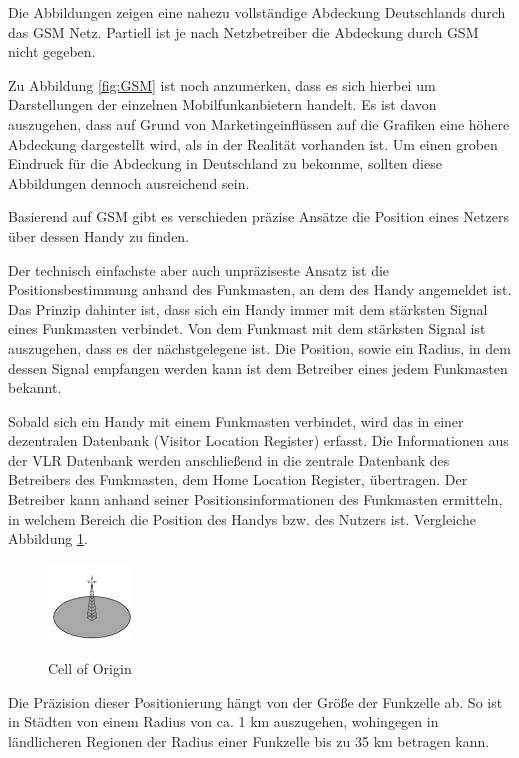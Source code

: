 Die Abbildungen zeigen eine nahezu vollständige Abdeckung Deutschlands durch das GSM Netz. Partiell ist je nach Netzbetreiber die Abdeckung durch GSM nicht gegeben.

Zu Abbildung \ref{fig:GSM} ist noch anzumerken, dass es sich hierbei um Darstellungen der einzelnen Mobilfunkanbietern handelt. Es ist davon auszugehen, dass auf Grund von Marketingeinflüssen auf die Grafiken eine höhere Abdeckung dargestellt wird, als in der Realität vorhanden ist. Um einen groben Eindruck für die Abdeckung in Deutschland zu bekomme, sollten diese Abbildungen dennoch ausreichend sein.


Basierend auf GSM gibt es verschieden präzise Ansätze die Position eines Netzers über dessen Handy zu finden.


Der technisch einfachste aber auch unpräziseste Ansatz ist die Positionsbestimmung anhand des Funkmasten, an dem des Handy angemeldet ist. Das Prinzip dahinter ist, dass sich ein Handy immer mit dem stärksten Signal eines Funkmasten verbindet. Von dem Funkmast mit dem stärksten Signal ist auszugehen, dass es der nächstgelegene ist. Die Position, sowie ein Radius, in dem dessen Signal empfangen werden kann ist dem Betreiber eines jedem Funkmasten bekannt. 

Sobald sich ein Handy mit einem Funkmasten verbindet, wird das in einer dezentralen Datenbank (Visitor Location Register) erfasst. Die Informationen aus der VLR Datenbank werden anschließend in die zentrale Datenbank des Betreibers des Funkmasten, dem Home Location Register, übertragen. Der Betreiber kann anhand seiner Positionsinformationen des Funkmasten ermitteln, in welchem Bereich die Position des Handys bzw. des Nutzers ist. Vergleiche Abbildung \ref{fig:CoO}.

\cite[S. 207]{Schiller2004}

\begin{figure}[h]
\centering
\includegraphics[width=0.2\textwidth]{ref/images/CellOfOrigin.PNG}
\caption[Cell of Origin]{Cell of Origin}
\label{fig:CoO}
\cite[S. 209]{Schiller2004}
\end{figure}

Die Präzision dieser Positionierung hängt von der Größe der Funkzelle ab. So ist in Städten von einem Radius von ca. 1 km auszugehen, wohingegen in ländlicheren Regionen der Radius einer Funkzelle bis zu 35 km betragen kann.
\cite[S. 207]{Schiller2004}


